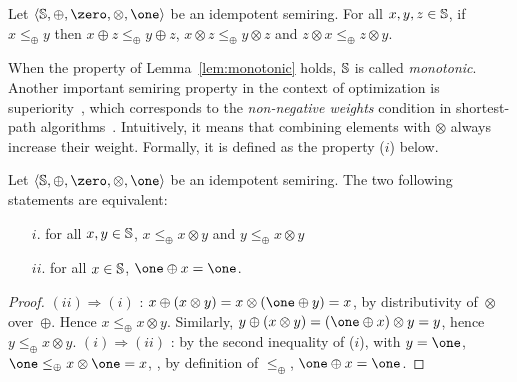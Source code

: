 \begin{lemma} \label{lem:monotonic}
Let $\< \Semiring, \oplus, \zero, \otimes, \one>$ be an idempotent semiring.
For all $x, y, z  \in \mathbb{S}$,  
if $x \leq_\oplus y$ then
$x \oplus z \leq_\oplus y \oplus z$,
$x \otimes z \leq_\oplus y \otimes z$
and $z \otimes x \leq_\oplus z \otimes y$.
\end{lemma}   
When the property of Lemma~\ref{lem:monotonic} holds, 
$\mathbb{S}$ is called  \emph{monotonic}. %
%
Another important semiring property in the context of optimization
is {superiority}~\cite{Huang08advanceddynamic}, 
which corresponds to the 
\emph{non-negative weights} condition in shortest-path algorithms~\cite{Dijkstra59anote}.
Intuitively, it means that combining elements with $\otimes$ always increase their weight. 
Formally, it is defined as the property ($i$) below. %

\begin{lemma}
\label{lem:superior}\label{lem:bounded}
Let $\< \Semiring, \oplus, \zero, \otimes, \one>$ be an idempotent semiring.
The two following statements are equivalent:
\begin{itemize}
\item [$i.$] for all $x, y \in \mathbb{S}$,  
$x \leq_\oplus x \otimes y$ and 
$y \leq_\oplus x \otimes y$
\item[$ii.$] for all $x \in \mathbb{S}$,  $\one \oplus x = \one$.
\end{itemize}
\end{lemma}
%
\begin{proof} %
$(ii) \Rightarrow (i)$ : 
$x \oplus (x \otimes y) = x \otimes (\one \oplus y) = x$, 
by distributivity of~$\otimes$ over~$\oplus$. 
Hence $x \leq_\oplus x \otimes y$.
Similarly, $y \oplus (x \otimes y) = (\one \oplus x) \otimes y = y$, 
hence $y \leq_\oplus x \otimes y$.
%
$(i) \Rightarrow (ii)$ :
by the second inequality of ($i$), with $y = \one$, 
$\one \leq_\oplus x \otimes \one = x$, \ie, 
by definition of $\leq_\oplus$, $\one \oplus x = \one$.
\end{proof}

